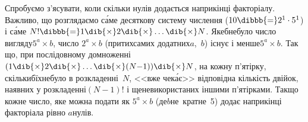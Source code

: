 
Спробуємо з'ясувати, коли скільки нулів додається наприкінці факторіалу. 
Важливо, 
що розглядаємо с\'{а}ме десяткову систему числення 
($10\dibbb{{=}}2^1\cdot5^1$) 
і с\'{а}ме $N! \dibbb{{=}} 1\dib{{\times}}2\dib{{\times}}\dots\dib{{\times}}N$. Яке\nolinebreak[3] б\nolinebreak[1] не\nolinebreak[3] було число вигляду\nolinebreak[2] ${5^{a}\times{}b}$, число ${2^{a}\times{}b}$ (при\nolinebreak[2] тих\nolinebreak[3] самих %
додатних\nolinebreak[2] $a$,~$b$) існує і менше\nolinebreak[2] ${5^{a}\times{}b}$. Так що, при послідовному домноженні $(1\dib{{\times}}2\dib{{\times}}\dots\dib{{\times}}(N{-}1))\dib{{\times}}N$, на кожну п'ятірку, скільки\nolinebreak[3] б\nolinebreak[2] їх\nolinebreak[2] не\nolinebreak[3] було в розкладенні~$N$, <<вже чек\'{а}є>> відповідна кількість двійок, наявних у розкладенні\nolinebreak[3] $(N{-}1)!$ і ще\nolinebreak[3] не\nolinebreak[3] використаних іншими п'ятірками. Так\nolinebreak[3] що кожне число, яке можна подати як ${5^{a}\times{}b}$ (де\nolinebreak[3] $b$\nolinebreak[2] не~кратне~5) додає наприкінці факторіала рівно $a$\nolinebreak[3] нулів.

